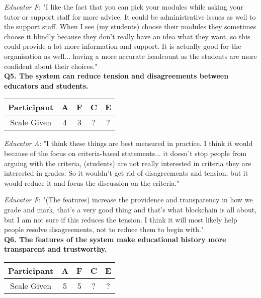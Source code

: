 \textit{Educator F}: "I like the fact that you can pick your modules while asking your tutor or support staff for more advice.
It could be administrative issues as well to the support staff. When I see (my students) choose their modules they sometimes
choose it blindly because they don't really have an idea what they want, so this could provide a lot more information and support.
It is actually good for the organisation as well... having a more accurate headcount as the students are more confident about their choices."\\

\textbf{Q5. The system can reduce tension and disagreements between educators and students.}\\
\begin{table}[!ht]
	\centering
	\begin{tabularx}{0.325\textwidth}{|c|c|c|c|c|}
		\hline
		Participant & A                      & F                      & C & E \\
		\hline
		Scale Given & \cellcolor{SpringGreen}4 & \cellcolor{Dandelion}3 & ? & ? \\
		\hline
	\end{tabularx}
\end{table}

\textit{Educator A}: "I think these things are best measured in practice. I think it would because of the focus on
criteria-based statements... it doesn't stop people from arguing with the criteria, (students) are not really interested
in criteria they are interested in grades. So it wouldn't get rid of disagreements and tension, but it would reduce it
and focus the discussion on the criteria."

\textit{Educator F}: "(The features) increase the providence and transparency in how we grade and mark,
that's a very good thing and that's what blockchain is all about, but I am not sure if this reduces the tension.
I think it will most likely help people resolve disagreements, not to reduce them to begin with."\\

\textbf{Q6. The features of the system make educational history more transparent and trustworthy.}\\
\begin{table}[!ht]
	\centering
	\begin{tabularx}{0.325\textwidth}{|c|c|c|c|c|}
		\hline
		Participant & A                  & F                  & C & E \\
		\hline
		Scale Given & \cellcolor{green}5 & \cellcolor{green}5 & ? & ? \\
		\hline
	\end{tabularx}
\end{table}


